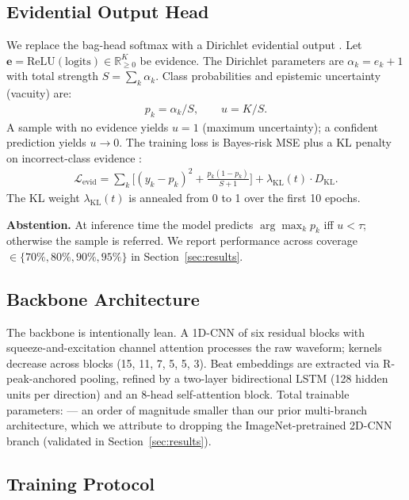 \documentclass[conference]{IEEEtran}
\begin{document}
\subsection{Evidential Output Head}

We replace the bag-head softmax with a Dirichlet evidential output \cite{sensoy2018}. Let $\mathbf{e} = \text{ReLU}(\text{logits}) \in \mathbb{R}^K_{\geq 0}$ be evidence. The Dirichlet parameters are $\alpha_k = e_k + 1$ with total strength $S = \sum_k \alpha_k$. Class probabilities and epistemic uncertainty (vacuity) are:
\begin{align}
p_k = \alpha_k / S, \qquad u = K / S.
\end{align}
A sample with no evidence yields $u=1$ (maximum uncertainty); a confident prediction yields $u \to 0$. The training loss is Bayes-risk MSE plus a KL penalty on incorrect-class evidence \cite{sensoy2018}:
\begin{align}
\mathcal{L}_{\text{evid}} = \sum_k \Big[(y_k - p_k)^2 + \tfrac{p_k(1-p_k)}{S+1}\Big] + \lambda_{\text{KL}}(t) \cdot D_{\text{KL}}.
\end{align}
The KL weight $\lambda_{\text{KL}}(t)$ is annealed from 0 to 1 over the first 10 epochs.

\textbf{Abstention.} At inference time the model predicts $\arg\max_k p_k$ iff $u < \tau$; otherwise the sample is referred. We report performance across coverage $\in \{70\%, 80\%, 90\%, 95\%\}$ in Section~\ref{sec:results}.

\subsection{Backbone Architecture}\label{sec:backbone}

The backbone is intentionally lean. A 1D-CNN of six residual blocks with squeeze-and-excitation channel attention \cite{hu2018} processes the raw waveform; kernels decrease across blocks (15, 11, 7, 5, 5, 3). Beat embeddings are extracted via R-peak-anchored pooling, refined by a two-layer bidirectional LSTM (128 hidden units per direction) and an 8-head self-attention block. Total trainable parameters: \unskip{} --- an order of magnitude smaller than our prior multi-branch architecture, which we attribute to dropping the ImageNet-pretrained 2D-CNN branch (validated in Section~\ref{sec:results}).

\subsection{Training Protocol}
\end{document}
